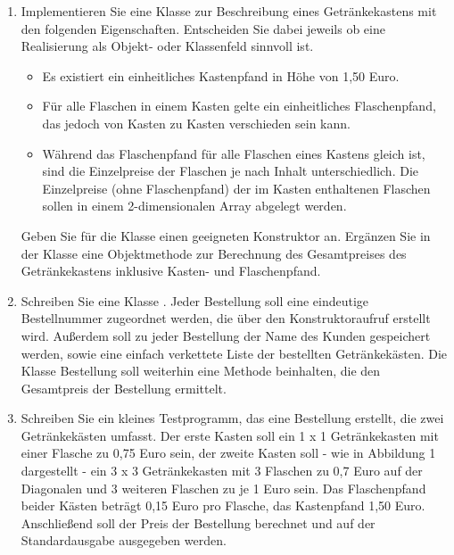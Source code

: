\documentclass{bschlangaul-aufgabe}
\begin{document}
\begin{enumerate}


\item Implementieren Sie eine Klasse  zur
Beschreibung eines Getränkekastens mit den folgenden Eigenschaften.
Entscheiden Sie dabei jeweils ob eine Realisierung als Objekt- oder
Klassenfeld sinnvoll ist.

\begin{itemize}
\item Es existiert ein einheitliches Kastenpfand in Höhe von 1,50 Euro.

\item Für alle Flaschen in einem Kasten gelte ein einheitliches
Flaschenpfand, das jedoch von Kasten zu Kasten verschieden sein kann.

\item Während das Flaschenpfand für alle Flaschen eines Kastens gleich
ist, sind die Einzelpreise der Flaschen je nach Inhalt unterschiedlich.
Die Einzelpreise (ohne Flaschenpfand) der im Kasten enthaltenen Flaschen
sollen in einem 2-dimensionalen Array abgelegt werden.
\end{itemize}

Geben Sie für die Klasse  einen geeigneten
Konstruktor an. Ergänzen Sie in der Klasse  eine
Objektmethode zur Berechnung des Gesamtpreises des Getränkekastens
inklusive Kasten- und Flaschenpfand.


\item Schreiben Sie eine Klasse . Jeder
Bestellung soll eine eindeutige Bestellnummer zugeordnet werden, die
über den Konstruktoraufruf erstellt wird. Außerdem soll zu jeder
Bestellung der Name des Kunden gespeichert werden, sowie eine einfach
verkettete Liste der bestellten Getränkekästen. Die Klasse Bestellung
soll weiterhin eine Methode beinhalten, die den Gesamtpreis der
Bestellung ermittelt.


\item Schreiben Sie ein kleines Testprogramm, das eine Bestellung
erstellt, die zwei Getränkekästen umfasst. Der erste Kasten soll ein 1 x
1 Getränkekasten mit einer Flasche zu 0,75 Euro sein, der zweite Kasten
soll - wie in Abbildung 1 dargestellt - ein 3 x 3 Getränkekasten mit 3
Flaschen zu 0,7 Euro auf der Diagonalen und 3 weiteren Flaschen zu je 1
Euro sein. Das Flaschenpfand beider Kästen beträgt 0,15 Euro pro
Flasche, das Kastenpfand 1,50 Euro. Anschließend soll der Preis der
Bestellung berechnet und auf der Standardausgabe ausgegeben werden.


\end{enumerate}
\end{document}
